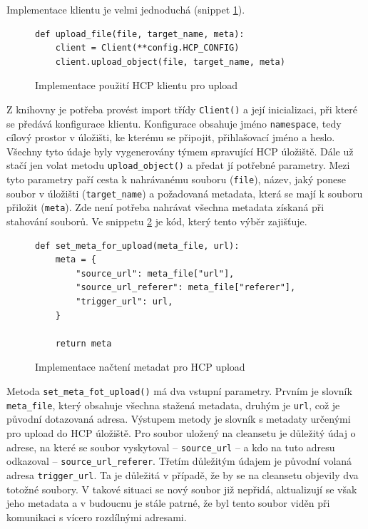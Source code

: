 \documentclass[thesis=M,czech,hidelinks]{FITthesis}[2013/05/06]
\begin{document}
Implementace klientu je velmi jednoduchá (snippet \ref{snip:hcpupload}).
\begin{figure}[h]               
	\begin{verbatim}
def upload_file(file, target_name, meta):
    client = Client(**config.HCP_CONFIG)
    client.upload_object(file, target_name, meta)
	\end{verbatim}      
	\caption{Implementace použití HCP klientu pro upload}
	\label{snip:hcpupload}
\end{figure}
Z knihovny je potřeba provést import třídy \texttt{Client()} a její inicializaci, při které se předává konfigurace klientu. Konfigurace obsahuje jméno \texttt{namespace}, tedy cílový prostor v úložišti, ke kterému se připojit, přihlašovací jméno a heslo. Všechny tyto údaje byly vygenerovány týmem spravující HCP úložiště. Dále už stačí jen volat metodu \texttt{upload_object()} a předat jí potřebné parametry. Mezi tyto parametry paří cesta k nahrávanému souboru (\texttt{file}), název, jaký ponese soubor v úložišti (\texttt{target_name}) a požadovaná metadata, která se mají k souboru přiložit (\texttt{meta}). Zde není potřeba nahrávat všechna metadata získaná při stahování souborů. Ve snippetu \ref{snip:metaupload} je kód, který tento výběr zajišťuje.

\begin{figure}[h]               
	\begin{verbatim}
def set_meta_for_upload(meta_file, url):
    meta = {
        "source_url": meta_file["url"],
        "source_url_referer": meta_file["referer"],
        "trigger_url": url,
    }
	
    return meta
	\end{verbatim}      
	\caption{Implementace načtení metadat pro HCP upload}
	\label{snip:metaupload}
\end{figure}

Metoda \texttt{set_meta_fot_upload()} má dva vstupní parametry. Prvním je slovník \texttt{meta_file}, který obsahuje všechna stažená metadata, druhým je \texttt{url}, což je původní dotazovaná adresa. Výstupem metody je slovník s metadaty určenými pro upload do HCP úložiště. Pro soubor uložený na cleansetu je důležitý údaj o adrese, na které se soubor vyskytoval – \texttt{source_url} – a kdo na tuto adresu odkazoval – \texttt{source_url_referer}. Třetím důležitým údajem je původní volaná adresa \texttt{trigger_url}. Ta je důležitá v případě, že by se na cleansetu objevily dva totožné soubory. V takové situaci se nový soubor již nepřidá, aktualizují se však jeho metadata a v budoucnu je stále patrné, že byl tento soubor viděn při komunikaci s vícero rozdílnými adresami.
\end{document}
